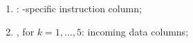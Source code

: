 \begin{enumerate}[resume]
      \item \expMacroInst{}: \godGiven{}
            \expMod{}-specific instruction column;
      \item {}, for $k = 1,\dots, 5$: \godGiven{}
            incoming data columns;
\end{enumerate}
